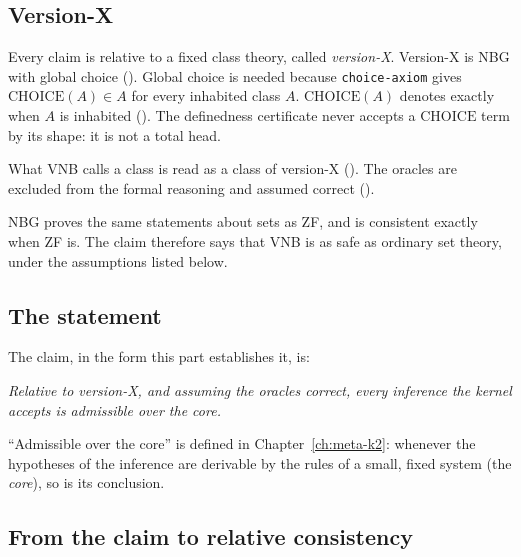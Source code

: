 \subsection{Version-X}

Every claim is relative to a fixed class theory, called
\emph{version-X}.  Version-X is NBG with global choice ().  Global
choice is needed because \texttt{choice-axiom} gives
$\mathrm{CHOICE}(A) \in A$ for every inhabited class $A$.
$\mathrm{CHOICE}(A)$ denotes exactly when $A$ is inhabited ().  The
definedness certificate never accepts a $\mathrm{CHOICE}$ term by its
shape: it is not a total head.

What VNB calls a class is read as a class of version-X ().  The
oracles are excluded from the formal reasoning and assumed correct
().

NBG proves the same statements about sets as ZF, and is consistent
exactly when ZF is.  The claim therefore says that VNB is as safe as
ordinary set theory, under the assumptions listed below.

\subsection{The statement}

The claim, in the form this part establishes it, is:
\begin{center}
\emph{Relative to version-X, and assuming the oracles correct, every
inference the kernel accepts is admissible over the core.}
\end{center}
``Admissible over the core'' is defined in
Chapter~\ref{ch:meta-k2}: whenever the hypotheses of the inference are
derivable by the rules of a small, fixed system (the \emph{core}), so is
its conclusion.

\subsection{From the claim to relative consistency}\label{sec:meta-chain}

